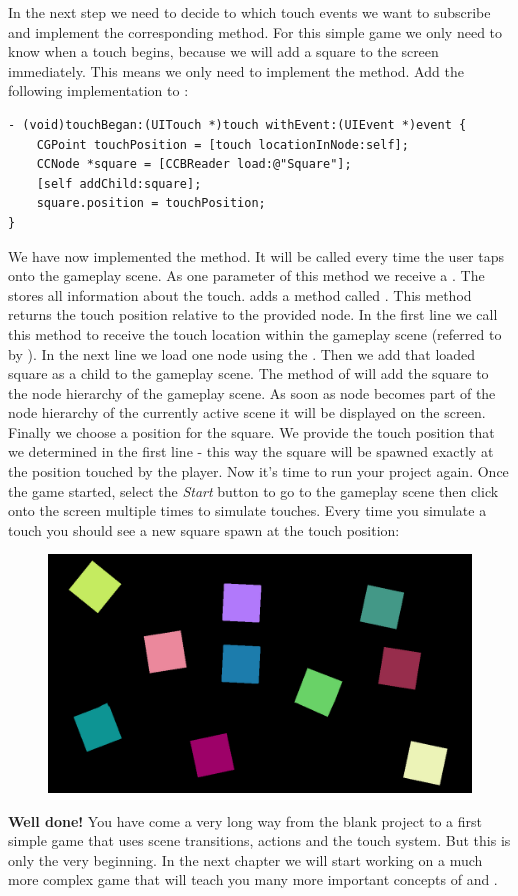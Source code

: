 In the next step we need to decide to which touch events we
want to subscribe and implement the corresponding method. For this simple game
we only need to know when a touch begins, because we will add a square to the
screen immediately. This means we only need to implement the
 method. Add the following implementation to
:
\begin{lstlisting}
- (void)touchBegan:(UITouch *)touch withEvent:(UIEvent *)event {
    CGPoint touchPosition = [touch locationInNode:self];
    CCNode *square = [CCBReader load:@"Square"];
    [self addChild:square];
    square.position = touchPosition;
}
\end{lstlisting}
We have now implemented the  method. It will be called
every time the user taps onto the gameplay scene. As one parameter of this
method we receive a . The  stores all
information about the touch. \cocos{} adds a method called
. This method returns the touch position
relative to the provided node. In the first line we call this method to receive
the touch location within the gameplay scene (referred to by ).
In the next line we load one  node using the
. Then we add that loaded square as a child to the
gameplay scene. The  method of \ccnode{} will add the
square to the node hierarchy of the gameplay scene. As soon as node becomes part
of the node hierarchy of the currently active scene it will be displayed on the
screen. Finally we choose a position for the square.
We provide the touch position that we determined in the first line - this way the square will be spawned exactly at the position touched by
the player. Now it's time to run your project again. Once the game started,
select the \textit{Start} button to go to the gameplay scene then click onto the
screen multiple times to simulate touches. Every time you simulate a touch you
should see a new square spawn at the touch position:
\begin{figure}[H]
		\centering
		\includegraphics[width=350pt]{images/firstproject/spinning_squares.png}
\end{figure}
\textbf{Well done!} You have come a very long way from the blank project to a
first simple game that uses scene transitions, actions and the \cocos{} touch
system. But this is only the very beginning. In the next chapter we will start
working on a much more complex game that will teach you many more important
concepts of \SB{} and \cocos{}. 

